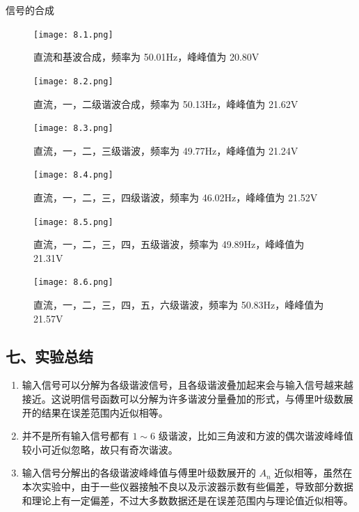 \documentclass[dvipsnames, svgnames,a4paper,11pt]{article}
\begin{document}
\begin{enumerate}
    \newpage
    信号的合成
    \begin{figure}[htbp]
      \centering
      \begin{minipage}[t]{0.48\textwidth}
      \centering
      \texttt{[image: 8.1.png]}
      \caption{直流和基波合成，频率为 50.01Hz，峰峰值为 20.80V}
      \end{minipage}
      \begin{minipage}[t]{0.48\textwidth}
      \centering
      \texttt{[image: 8.2.png]}
      \caption{直流，一，二级谐波合成，频率为 50.13Hz，峰峰值为 21.62V}
      \end{minipage}

      \begin{minipage}[t]{0.48\textwidth}
      \centering
      \texttt{[image: 8.3.png]}
      \caption{直流，一，二，三级谐波，频率为 49.77Hz，峰峰值为 21.24V}
      \end{minipage}
      \centering
      \begin{minipage}[t]{0.48\textwidth}
      \centering
      \texttt{[image: 8.4.png]}
      \caption{直流，一，二，三，四级谐波，频率为 46.02Hz，峰峰值为 21.52V}
      \end{minipage}

      \begin{minipage}[t]{0.48\textwidth}
      \centering
      \texttt{[image: 8.5.png]}
      \caption{直流，一，二，三，四，五级谐波，频率为 49.89Hz，峰峰值为 21.31V}
      \end{minipage}
      \begin{minipage}[t]{0.48\textwidth}
      \centering
      \texttt{[image: 8.6.png]}
      \caption{直流，一，二，三，四，五，六级谐波，频率为 50.83Hz，峰峰值为 21.57V}
      \end{minipage}
    \end{figure}


\end{enumerate}

\subsection*{七、实验总结}
\begin{enumerate}
  \item 输入信号可以分解为各级谐波信号，且各级谐波叠加起来会与输入信号越来越接近。这说明信号函数可以分解为许多谐波分量叠加的形式，与傅里叶级数展开的结果在误差范围内近似相等。
  \item 并不是所有输入信号都有 $1 \sim 6$ 级谐波，比如三角波和方波的偶次谐波峰峰值较小可近似忽略，故只有奇次谐波。
  \item 输入信号分解出的各级谐波峰峰值与傅里叶级数展开的 $A_n$ 近似相等，虽然在本次实验中，由于一些仪器接触不良以及示波器示数有些偏差，导致部分数据和理论上有一定偏差，不过大多数数据还是在误差范围内与理论值近似相等。
\end{enumerate}
\end{document}
